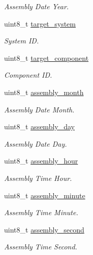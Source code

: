 \begin{DoxyCompactItemize}
\begin{DoxyCompactList}\small\item\em Assembly Date Year. \end{DoxyCompactList}\item 
uint8\+\_\+t \hyperlink{struct____mavlink__gimbal__set__factory__parameters__t_a2e55933e576412cc548941fa2448033a}{target\+\_\+system}
\begin{DoxyCompactList}\small\item\em System I\+D. \end{DoxyCompactList}\item 
uint8\+\_\+t \hyperlink{struct____mavlink__gimbal__set__factory__parameters__t_aa6a48765b2597841c1996444c95f23e7}{target\+\_\+component}
\begin{DoxyCompactList}\small\item\em Component I\+D. \end{DoxyCompactList}\item 
uint8\+\_\+t \hyperlink{struct____mavlink__gimbal__set__factory__parameters__t_a6eece61be5e6518370cebea9fdd32ae4}{assembly\+\_\+month}
\begin{DoxyCompactList}\small\item\em Assembly Date Month. \end{DoxyCompactList}\item 
uint8\+\_\+t \hyperlink{struct____mavlink__gimbal__set__factory__parameters__t_a95a156b097ecc9904aeab4ba4e2d4d06}{assembly\+\_\+day}
\begin{DoxyCompactList}\small\item\em Assembly Date Day. \end{DoxyCompactList}\item 
uint8\+\_\+t \hyperlink{struct____mavlink__gimbal__set__factory__parameters__t_a4d6702dcd8f098821c9fedbe8052f82e}{assembly\+\_\+hour}
\begin{DoxyCompactList}\small\item\em Assembly Time Hour. \end{DoxyCompactList}\item 
uint8\+\_\+t \hyperlink{struct____mavlink__gimbal__set__factory__parameters__t_a0219bb135ddc4d7153cc00cd0846bfe0}{assembly\+\_\+minute}
\begin{DoxyCompactList}\small\item\em Assembly Time Minute. \end{DoxyCompactList}\item 
uint8\+\_\+t \hyperlink{struct____mavlink__gimbal__set__factory__parameters__t_a444e2c166f237315044cd6618c39357b}{assembly\+\_\+second}
\begin{DoxyCompactList}\small\item\em Assembly Time Second. \end{DoxyCompactList}\end{DoxyCompactItemize}


